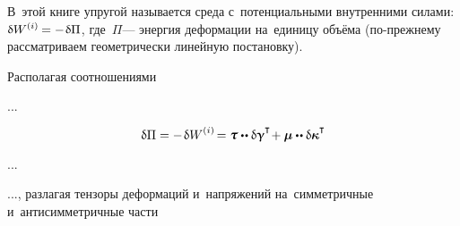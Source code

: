 \begin{otherlanguage}{russian}

В~этой книге упругой называется среда с~потенциальными внутренними силами: ${\variation{\internalwork} = - \hspace{.16ex} \variation{\Pi}}$, где~$\Pi$\:--- энергия деформации на~единицу объёма (по\hbox{-}прежнему рассматриваем геометрически линейную постановку).

Располагая соотношениями

...

\[
\variation{\Pi} = - \hspace{.2ex} \variation{\internalwork} \hspace{-0.15ex}
= \forcestresstensor \dotdotp \variation{\distortiontensor}^{\T} \hspace{-0.4ex}
+ \couplestresstensor \dotdotp \variation{\wrynesstensor}^{\T}
\]

...

..., разлагая тензоры деформаций и~напряжений на~симметричные и~антисимметричные части


\end{otherlanguage}
